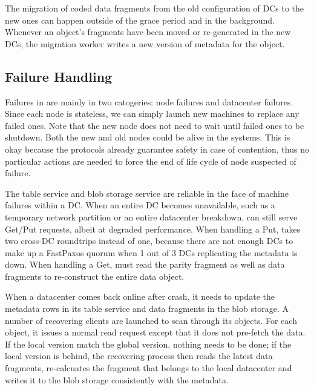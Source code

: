 The migration of coded data fragments from the old configuration of DCs to the
new ones can happen outside of the grace period and in the background. Whenever 
an object's fragments have been moved or re-generated in the new DCs, the migration worker 
writes a new version of metadata for the object.


\subsection{Failure Handling}

Failures in {\name} are mainly in two catogeries: {\name} node failures and
datacenter failures. Since each \name node is stateless, 
we can simply launch new machines to replace any failed ones.
Note that the new node does not need to wait until
failed ones to be shutdown.  Both the new and old nodes could be
alive in the systems. This is okay because the {\name} protocols already
guarantee safety in case of contention, thus no particular actions are needed
to force the end of life cycle of node suspected of failure.

The table service and blob storage service are reliable in the face of machine
failures within a DC.  When an entire DC becomes unavailable, such as a
temporary network partition or an entire datacenter breakdown, {\name} can
still serve Get/Put requests, albeit at degraded performance. When handling a Put, 
\name takes two cross-DC roundtrips instead of one,
because there are not enough DCs to make up a FastPaxos quorum when 1 out of 3 DCs
replicating the metadata is down.  When handling a Get, \name must read the parity 
fragment as well as data fragments to re-construct the entire data object.

When a datacenter comes back online after crash, it needs to update the
metadata rows in its table service and data fragments in the blob storage.
A number of recovering clients are launched to scan through its objects.
For each object, it issues a normal read request except that it does not
pre-fetch the data. If the local version match the global version, nothing
needs to be done; if the local version is behind, the recovering process
then reads the latest data fragments, re-calcuates the fragment that belongs
to the local datacenter and writes it to the blob storage consistently with
the metadata.

